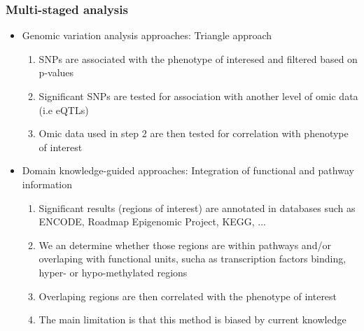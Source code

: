 \documentclass[10pt,xcolor=dvipsnames]{beamer}\usepackage[]{graphicx}\usepackage[]{color}
\begin{document}
\begin{frame}\frametitle{Multi-staged analysis}
\begin{itemize}
\item \textcolor{OliveGreen}{Genomic variation analysis approaches}: Triangle approach
   \begin{enumerate}
    \item SNPs are associated with the phenotype of interesed and filtered based on p-values
    \item Significant SNPs are tested for association with another level of omic data (i.e eQTLs)
    \item Omic data used in step 2 are then tested for correlation with phenotype of interest
   \end{enumerate}

\pause

\item \textcolor{OliveGreen}{Domain knowledge-guided approaches}: Integration of functional and pathway information
   \begin{enumerate}
    \item Significant results (regions of interest) are annotated in databases such as ENCODE, Roadmap Epigenomic Project, KEGG, ...
    \item We an determine whether those regions are within pathways and/or overlaping with functional units, sucha as transcription factors binding, hyper- or hypo-methylated regions
    \item Overlaping regions are then correlated with the phenotype of interest
    \item The main limitation is that this method is biased by current knowledge
   \end{enumerate}
\end{itemize}
\end{frame}
\end{document}
